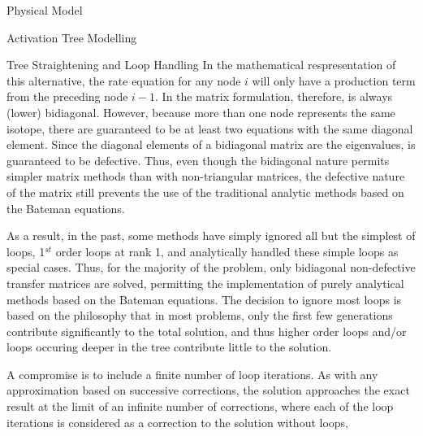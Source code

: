 \begin{chapter}{Physical Model\label{chap:physical}}
\begin{section}{Activation Tree Modelling\label{sec:physical.chains}}
\begin{subsection}{Tree Straightening and Loop Handling}
    In the mathematical respresentation of this alternative, the rate
    equation for any node $i$ will only have a production term from
    the preceding node $i-1$.  In the matrix formulation, therefore,
     is always (lower) bidiagonal.  However, because more than
    one node represents the same isotope, there are guaranteed to be
    at least two equations with the same diagonal element.  Since the
    diagonal elements of a bidiagonal matrix are the eigenvalues,
     is guaranteed to be defective.  Thus, even though the
    bidiagonal nature permits simpler matrix methods than with
    non-triangular matrices, the defective nature of the matrix still
    prevents the use of the traditional analytic methods based on the
    Bateman equations.
    
    As a result, in the past, some methods have simply ignored all but
    the simplest of loops, 1$^{st}$ order loops at rank 1, and
    analytically handled these simple loops as special cases.  Thus,
    for the majority of the problem, only bidiagonal non-defective
    transfer matrices are solved, permitting the implementation of
    purely analytical methods based on the Bateman equations.  The
    decision to ignore most loops is based on the philosophy that in
    most problems, only the first few generations contribute
    significantly to the total solution, and thus higher order loops
    and/or loops occuring deeper in the tree contribute little to the
    solution.
    
    A compromise is to include a finite number of loop iterations.  As
    with any approximation based on successive corrections, the
    solution approaches the exact result at the limit of an infinite
    number of corrections, where each of the loop iterations is
    considered as a correction to the solution without loops,
    

\end{subsection}
\end{section}
\end{chapter}
